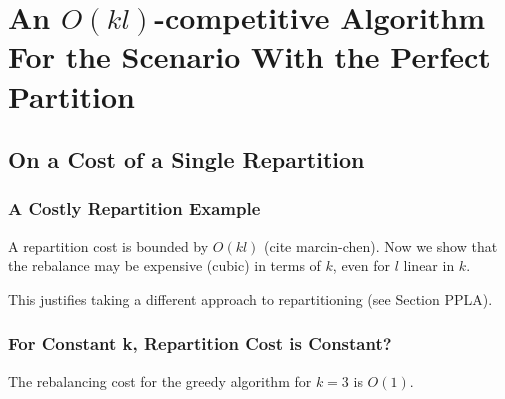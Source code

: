 
\section{An $O(kl)$-competitive Algorithm For the Scenario With the Perfect Partition}

\subsection{On a Cost of a Single Repartition}


\subsubsection{A Costly Repartition Example}

A repartition cost is bounded by $O(kl)$ (cite marcin-chen).
Now we show that the rebalance may be expensive (cubic) in terms of $k$, even for $l$ linear in $k$.

This justifies taking a different approach to repartitioning (see Section PPLA).


\subsubsection{For Constant k, Repartition Cost is Constant?}


\begin{theorem}
  The rebalancing cost for the greedy algorithm for $k=3$ is $O(1)$.
  \label{rebalancing-cost}
\end{theorem}


